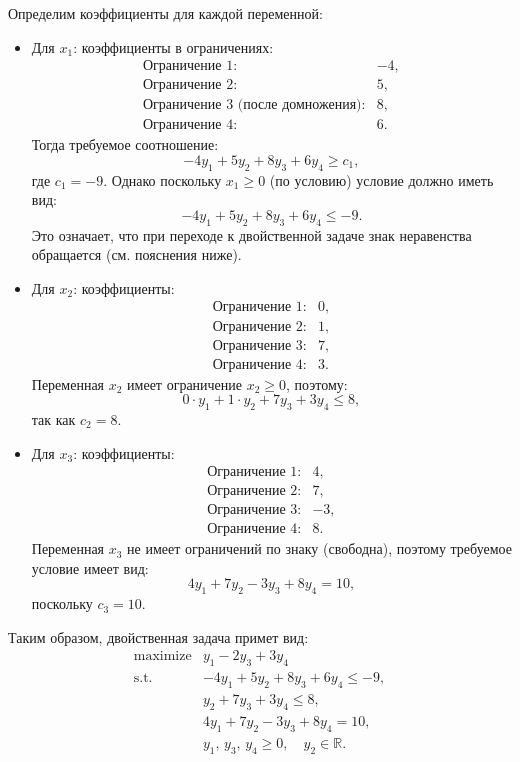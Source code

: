 \documentclass[a4paper,12pt]{article}
\begin{document}
	Определим коэффициенты для каждой переменной:
	\begin{itemize}[leftmargin=1cm]
		\item Для $x_1$: коэффициенты в ограничениях:
		\[
		\begin{array}{ll}
			\text{Ограничение 1:} & -4,\\[1mm]
			\text{Ограничение 2:} & 5,\\[1mm]
			\text{Ограничение 3 (после домножения):} & 8,\\[1mm]
			\text{Ограничение 4:} & 6.
		\end{array}
		\]
		Тогда требуемое соотношение:
		\[
		-4y_1 + 5y_2 + 8y_3 + 6y_4 \ge c_1,
		\]
		где $c_1=-9$. Однако поскольку $x_1\ge 0$ (по условию) условие должно иметь вид:
		\[
		-4y_1 + 5y_2 + 8y_3 + 6y_4 \le -9.
		\]
		Это означает, что при переходе к двойственной задаче знак неравенства обращается (см. пояснения ниже).  
		\item Для $x_2$: коэффициенты:
		\[
		\begin{array}{ll}
			\text{Ограничение 1:} & 0,\\[1mm]
			\text{Ограничение 2:} & 1,\\[1mm]
			\text{Ограничение 3:} & 7,\\[1mm]
			\text{Ограничение 4:} & 3.
		\end{array}
		\]
		Переменная $x_2$ имеет ограничение $x_2\ge 0$, поэтому:
		\[
		0\cdot y_1 + 1\cdot y_2 + 7y_3 + 3y_4 \le 8,
		\]
		так как $c_2=8$.
		\item Для $x_3$: коэффициенты:
		\[
		\begin{array}{ll}
			\text{Ограничение 1:} & 4,\\[1mm]
			\text{Ограничение 2:} & 7,\\[1mm]
			\text{Ограничение 3:} & -3,\\[1mm]
			\text{Ограничение 4:} & 8.
		\end{array}
		\]
		Переменная $x_3$ не имеет ограничений по знаку (свободна), поэтому требуемое условие имеет вид:
		\[
		4y_1 + 7y_2 - 3y_3 + 8y_4 = 10,
		\]
		поскольку $c_3=10$.
	\end{itemize}
	
	Таким образом, двойственная задача примет вид:
	\[
	\begin{array}{rl}
		\text{maximize} & y_1 - 2y_3 + 3y_4\\[1mm]
		\text{s.t.} & -4y_1 + 5y_2 + 8y_3 + 6y_4 \le -9,\\[1mm]
		& y_2 + 7y_3 + 3y_4 \le 8,\\[1mm]
		& 4y_1 + 7y_2 - 3y_3 + 8y_4 = 10,\\[1mm]
		& y_1,\, y_3,\, y_4 \ge 0,\quad y_2\in\mathbb{R}.
	\end{array}
	\]
	\vspace{2mm}
	
\end{document}
